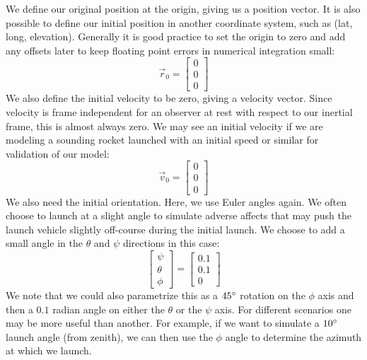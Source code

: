 \documentclass[12pt]{report}
\begin{document}
We define our original position at the origin, giving us a position vector. It is also possible to define our initial position in another coordinate system, such as (lat, long, elevation). Generally it is good practice to set the origin to zero and add any offsets later to keep floating point errors in numerical integration small:
$$\vec{r}_0=\begin{bmatrix}
    0\\0\\0
\end{bmatrix}$$
We also define the initial velocity to be zero, giving a velocity vector. Since velocity is frame independent for an observer at rest with respect to our inertial frame, this is almost always zero. We may see an initial velocity if we are modeling a sounding rocket launched with an initial speed or similar for validation of our model:
$$\vec{v}_0=\begin{bmatrix}
    0\\0\\0
\end{bmatrix}$$
We also need the initial orientation. Here, we use \gls{Euler angles} again. We often choose to launch at a slight angle to simulate adverse affects that may push the launch vehicle slightly off-course during the initial launch. We choose to add a small angle in the $\theta$ and $\psi$ directions in this case:
\begin{equation}\label{eq: euler angles 6DoF}
    \begin{bmatrix}
    \psi\\\theta\\\phi
\end{bmatrix} =
\begin{bmatrix}
    0.1\\0.1\\0
\end{bmatrix}
\end{equation}
We note that we could also parametrize this as a $45\degree$ rotation on the $\phi$ axis and then a $0.1$ radian angle on either the $\theta$ or the $\psi$ axis. For different scenarios one may be more useful than another. For example, if we want to simulate a $10\degree$ launch angle (from zenith), we can then use the $\phi$ angle to determine the azimuth at which we launch.
\end{document}
